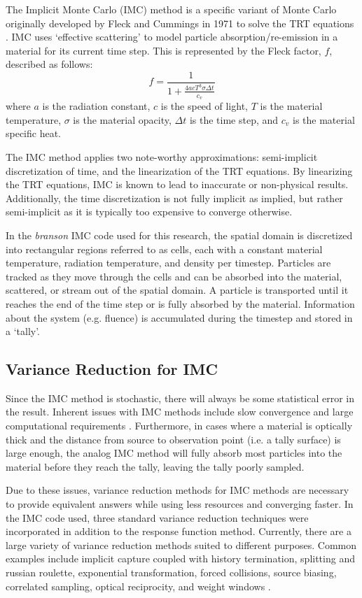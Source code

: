 \documentclass[]{article}
\begin{document}
		The Implicit Monte Carlo (IMC) method is a specific variant of Monte Carlo originally developed by Fleck and Cummings in 1971 to solve the TRT equations \cite{FC71}. IMC uses `effective scattering' to model particle absorption/re-emission in a material for its current time step. This is represented by the Fleck factor, $f$, described as follows:
		\begin{equation}
			f = \frac{1}{1 + \frac{4acT^{3}\sigma \Delta t}{c_{v}}}
		\end{equation}
		where $a$ is the radiation constant, $c$ is the speed of light, $T$ is the material temperature, $\sigma$ is the material opacity, $\Delta t$ is the time step, and $c_{v}$ is the material specific heat.

		The IMC method applies two note-worthy approximations: semi-implicit discretization of time, and the linearization of the TRT equations. By linearizing the TRT equations, IMC is known to lead to inaccurate or non-physical results. Additionally, the time discretization is not fully implicit as implied, but rather semi-implicit as it is typically too expensive to converge otherwise.

    In the \textit{branson} IMC code used for this research, the spatial domain is discretized into rectangular regions referred to as cells, each with a constant material temperature, radiation temperature, and density per timestep. Particles are tracked as they move through the cells and can be absorbed into the material, scattered, or stream out of the spatial domain. A particle is transported until it reaches the end of the time step or is fully absorbed by the material. Information about the system (e.g. fluence) is accumulated during the timestep and stored in a `tally'.

	\subsection{Variance Reduction for IMC}
		Since the IMC method is stochastic, there will always be some statistical error in the result. Inherent issues with IMC methods include slow convergence and large computational requirements \cite{AW16}. Furthermore, in cases where a material is optically thick and the distance from source to observation point (i.e. a tally surface) is large enough, the analog IMC method will fully absorb most particles into the material before they reach the tally, leaving the tally poorly sampled.

		Due to these issues, variance reduction methods for IMC methods are necessary to provide equivalent answers while using less resources and converging faster. In the IMC code used, three standard variance reduction techniques were incorporated in addition to the response function method. Currently, there are a large variety of variance reduction methods suited to different purposes. Common examples include implicit capture coupled with history termination, splitting and russian roulette, exponential transformation, forced collisions, source biasing, correlated sampling, optical reciprocity, and weight windows \cite{JL16}.
\end{document}
